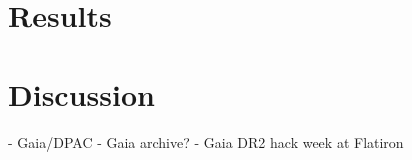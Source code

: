 \documentclass[twocolumn]{aastex61}
\begin{document}













\section{Results}








\section{Discussion}




\acknowledgements
- Gaia/DPAC
- Gaia archive?
- Gaia DR2 hack week at Flatiron
\end{document}
